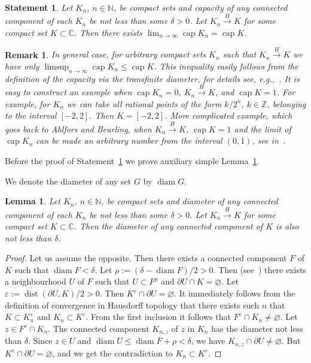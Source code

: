 \documentclass[12pt]{article}
\newtheorem{Statement}{Statement}
\newtheorem{Lemma}{Lemma}
\newtheorem{Remark}{Remark}
\def\CC{\mathbb C}
\def\NN{\mathbb N}
\def\ZZ{\mathbb Z}
\def\mcap{\operatorname{cap}}
\def\dist{\operatorname{dist}}
\def\diam{\operatorname{diam}}
\begin{document}
\begin{Statement}
\label{St_H_cap}
Let $K_n$, $n\in\NN$, be compact sets and capacity of any connected component of each $K_n$ be not less than some $\delta>0$. Let $K_n\xrightarrow{H}K$ for some compact set $K\subset\CC$. Then there exists $\lim_{n\to\infty}\mcap{K_n}=\mcap K$.
\end{Statement}

\begin{Remark}
In general case, for arbitrary compact sets $K_n$ such that $K_n\xrightarrow{H}K$ we have only $\limsup_{n\to\infty}\mcap{K_n}\leq\mcap K$. This inequality easily follows from the definition of the capacity via the transfinite diameter, for details see, e.g.,~\cite[Section~2]{KaKo22}. It is easy to construct an example when $\mcap K_n=0$, $K_n\xrightarrow{H}K$, and $\mcap K=1$. For example, for $K_n$ we can take all rational points of the form $k/2^n$, $k\in\ZZ$, belonging to the interval $[-2,2]$. Then $K=[-2,2]$. More complicated example, which goes back to Ahlfors and Beurling, when $K_n\xrightarrow{H}K$, $\mcap K =1$ and the limit of $\mcap K_n$ can be made an arbitrary number from the interval $(0,1)$, see in~\cite[Proposition 4.1]{KaKo22}.
\end{Remark}

Before the proof of Statement~\ref{St_H_cap} we prove auxiliary simple Lemma~\ref{L_H}.

We denote the diameter of any set $G$ by $\diam G$.

\begin{Lemma}
\label{L_H}
Let $K_n$, $n\in\NN$, be compact sets and diameter of any connected component of each $K_n$ be not less than some $\delta>0$. Let $K_n\xrightarrow{H}K$ for some compact set $K\subset\CC$. Then the diameter of any connected component of $K$ is also not less than $\delta$.
\end{Lemma}
\begin{proof}
Let us assume the opposite. Then there exists a connected component $F$ of $K$ such that $\diam F<\delta$. Let $\rho:=(\delta-\diam F)/2>0$. 
Then (see~\cite[Corollary after Theorem~21]{Al77}) there exists a neighbourhood $U$ of $F$ such that $U\subset F^\rho$ and $\partial U\cap K=\varnothing$.
Let $\varepsilon:= \dist(\partial U, K)/2>0$. Then $K^\varepsilon\cap \partial U =\varnothing$. It immediately follows from the definition of convergence in Hausdorff topology that there exists such $n$ that $K\subset K_n^{\varepsilon}$ and $K_n\subset K^{\varepsilon}$. From the first inclusion it follows that $F^\varepsilon\cap K_n\ne\varnothing$. Let $z\in F^\varepsilon\cap K_n$. The connected component $K_{n, z}$ of $z$ in $K_n$ has the diameter not less than $\delta$. Since $z\in U$ and $\diam U\leq\diam F+\rho<\delta$, we have $K_{n, z}\cap\partial U\ne\varnothing$. But $K^\varepsilon\cap \partial U =\varnothing$, and we get the contradiction to $K_n\subset K^{\varepsilon}$.
\end{proof}
\end{document}
